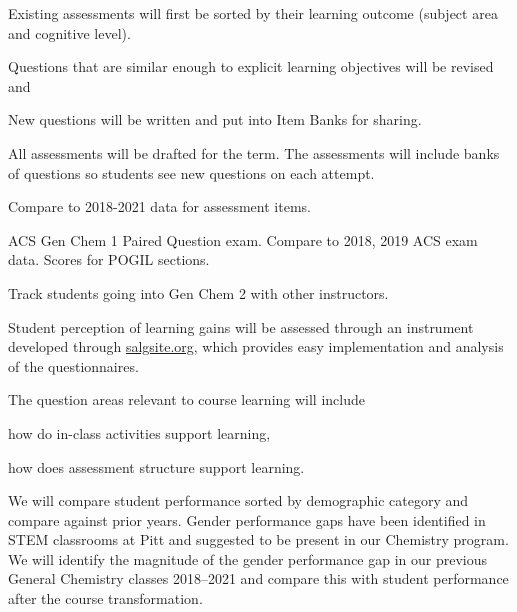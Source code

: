 \documentclass[10pt,letterpaper]{article}
\begin{document}
%
%

 Existing assessments will first be sorted by their learning outcome (subject area and cognitive level). 

 Questions that are similar enough to explicit learning objectives will be revised and 

 New questions will be written and put into Item Banks for sharing.

All assessments will be drafted for the term. The assessments will include banks of questions so students see new questions on each attempt. 


\subaim{}



%
%


 Compare to 2018-2021 data for assessment items.

 ACS Gen Chem 1 Paired Question exam.  Compare to 2018, 2019 ACS exam data. Scores for POGIL sections.

 Track students going into Gen Chem 2 with other instructors. 

Student perception of learning gains will be assessed through an instrument developed through \url{salgsite.org}, which provides easy implementation and analysis of the questionnaires. 

The question areas relevant to course learning will include
\begin{enumerate*}[label=\textbf{\arabic*.)}]
  \item how do in-class activities support learning,
\item how does assessment structure support learning.
\end{enumerate*}

 We will compare student performance sorted by demographic category and compare against prior years. Gender performance gaps have been identified in STEM classrooms at Pitt and suggested to be present in our Chemistry program. We will identify the magnitude of the gender performance gap in our previous General Chemistry classes 2018--2021 and compare this with student performance after the course transformation.
\end{document}
